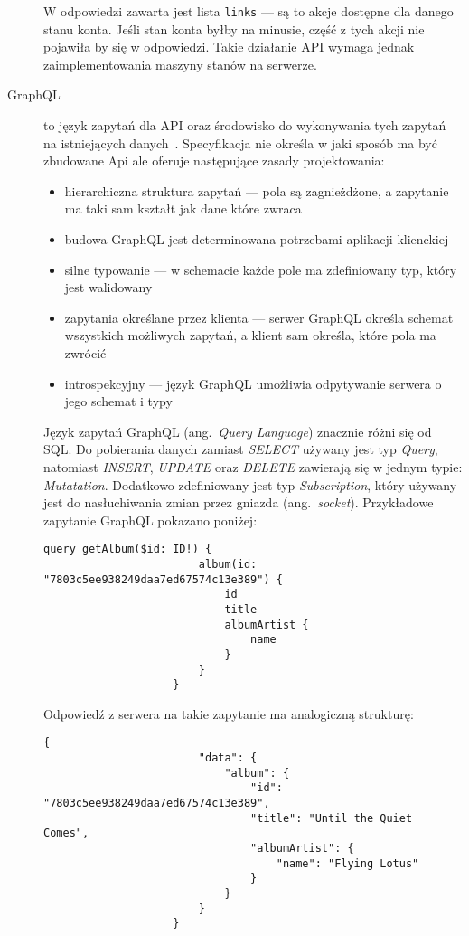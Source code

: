 \begin{description}
				W odpowiedzi zawarta jest lista \verb|links| --- są to akcje dostępne dla danego stanu konta.
				Jeśli stan konta byłby na minusie, część z tych akcji nie pojawiła by się w odpowiedzi.
				Takie działanie API wymaga jednak zaimplementowania maszyny stanów na serwerze.

			\item[GraphQL] to język zapytań dla API oraz środowisko do wykonywania tych zapytań na istniejących danych~\cite{GQLsite}.
				Specyfikacja nie określa w jaki sposób ma być zbudowane Api ale oferuje następujące zasady projektowania\cite{GQLspec}:
				\begin{itemize}
					\item hierarchiczna struktura zapytań --- pola są zagnieżdżone, a zapytanie ma taki sam kształt jak dane które zwraca
					\item budowa GraphQL jest determinowana potrzebami aplikacji klienckiej
					\item silne typowanie --- w schemacie każde pole ma zdefiniowany typ, który jest walidowany
					\item zapytania określane przez klienta --- serwer GraphQL określa schemat wszystkich możliwych zapytań,
						a klient sam określa, które pola ma zwrócić
					\item introspekcyjny --- język GraphQL umożliwia odpytywanie serwera o jego schemat i typy
				\end{itemize}

				Język zapytań GraphQL (ang.\ \emph{Query Language}) znacznie różni się od SQL.
				Do pobierania danych zamiast \emph{SELECT} używany jest typ \emph{Query},
				natomiast \emph{INSERT}, \emph{UPDATE} oraz \emph{DELETE} zawierają się w jednym typie: \emph{Mutatation}.
				Dodatkowo zdefiniowany jest typ \emph{Subscription}, który używany jest do nasłuchiwania zmian przez gniazda (ang.\ \emph{socket}).
				Przykładowe zapytanie GraphQL pokazano poniżej:

				\begin{lstlisting}[label=lst:gqlQuery]
					query getAlbum($id: ID!) {
						album(id: "7803c5ee938249daa7ed67574c13e389") {
							id
							title
							albumArtist {
								name
							}
						}
					}
				\end{lstlisting}
				
				Odpowiedź z serwera na takie zapytanie ma analogiczną strukturę:

				\begin{lstlisting}[label=lst:gqlQueryRes]
					{
						"data": {
							"album": {
								"id": "7803c5ee938249daa7ed67574c13e389",
								"title": "Until the Quiet Comes",
								"albumArtist": {
									"name": "Flying Lotus"
								}
							}
						}
					}
				\end{lstlisting}


\end{description}
